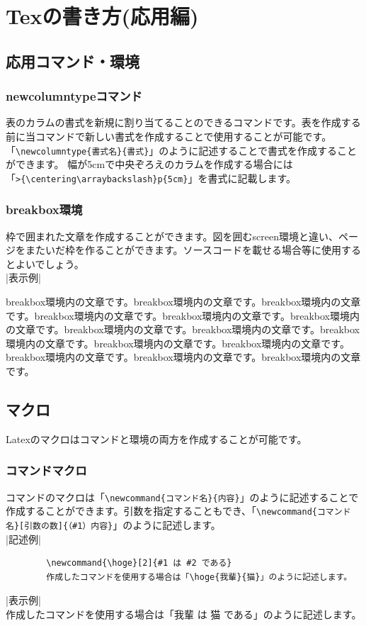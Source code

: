\chapter{Texの書き方(応用編)}
\label{chp:tex_pro}

\section{応用コマンド・環境}
\label{sec:tex_pro_cmd}
\subsection{newcolumntypeコマンド}
\label{sub:tex_pro_cmd_newcol}
	表のカラムの書式を新規に割り当てることのできるコマンドです。表を作成する前に当コマンドで新しい書式を作成することで使用することが可能です。\\
	「\verb|\newcolumntype{書式名}{書式}|」のように記述することで書式を作成することができます。
幅が5cmで中央ぞろえのカラムを作成する場合には\\「\verb|>{\centering\arraybackslash}p{5cm}|」を書式に記載します。

\subsection{breakbox環境}
\label{sub:tex_pro_cmd_break}
	枠で囲まれた文章を作成することができます。図を囲むscreen環境と違い、ページをまたいだ枠を作ることができます。ソースコードを載せる場合等に使用するとよいでしょう。\\
	|表示例|
\begin{breakbox}
\noindent breakbox環境内の文章です。breakbox環境内の文章です。breakbox環境内の文章です。breakbox環境内の文章です。breakbox環境内の文章です。breakbox環境内の文章です。breakbox環境内の文章です。breakbox環境内の文章です。breakbox環境内の文章です。breakbox環境内の文章です。breakbox環境内の文章です。breakbox環境内の文章です。breakbox環境内の文章です。breakbox環境内の文章です。
\end{breakbox}

\section{マクロ}
\label{sec:tex_pro_macro}
	Latexのマクロはコマンドと環境の両方を作成することが可能です。

\subsection{コマンドマクロ}
\label{sub:tex_pro_macro_cmd}
	コマンドのマクロは「\verb|\newcommand{コマンド名}{内容}|」のように記述することで作成することができます。引数を指定することもでき、「\verb|\newcommand{コマンド名}[引数の数]{（#1）内容}|」のように記述します。\\
	|記述例|
	\begin{verbatim}
		\newcommand{\hoge}[2]{#1 は #2 である}
		作成したコマンドを使用する場合は「\hoge{我輩}{猫}」のように記述します。
	\end{verbatim}
	|表示例|\\
	\newcommand{\hoge}[2]{#1 は #2 である}
	作成したコマンドを使用する場合は「\hoge{我輩}{猫}」のように記述します。

